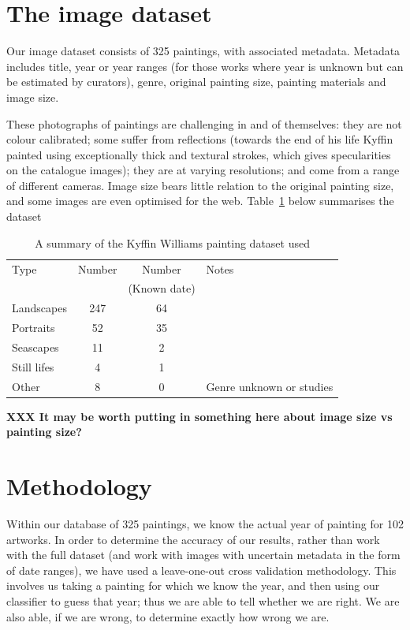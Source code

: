 \documentclass[conference,a4paper]{IEEEtran}
\begin{document}
\section{The image dataset}

Our image dataset consists of 325 paintings, with associated metadata. Metadata
includes title, year or year ranges (for those works where year is unknown but
can be estimated by curators), genre, original painting size, painting
materials and image size.

These photographs of paintings are challenging in and of themselves: they are
not colour calibrated; some suffer from reflections (towards the end of his
life Kyffin painted using exceptionally thick and textural strokes, which gives
specularities on the catalogue images); they are at varying resolutions; and
come from a range of different cameras. Image size bears little relation to the
original painting size, and some images are even optimised for the web.
Table~\ref{summary_t} below summarises the dataset

\begin{table}[h]
\centering
\begin{tabular}{| l | c | c | p{3cm} |}
\hline
Type & Number & Number & Notes \\
  & & (Known date) &  \\
\hline
Landscapes  & 247 & 64 & \\
Portraits   &  52 & 35 & \\
Seascapes   &  11 &  2 & \\
Still lifes &   4 &  1 & \\
Other       &   8 &  0 & Genre unknown or studies \\
\hline
\end{tabular}
\caption{A summary of the Kyffin Williams painting dataset used}
\label{summary_t}
\end{table}

\textbf{XXX It may be worth putting in something here about image size vs painting size?}


\section{Methodology}

Within our database of 325 paintings, we know the actual year of painting for
102 artworks. In order to determine the accuracy of our results, rather than
work with the full dataset (and work with images with uncertain metadata in the
form of date ranges), we have used a leave-one-out cross validation
methodology. This involves us taking a painting for which we know the year, and
then using our classifier to guess that year; thus we are able to tell whether
we are right. We are also able, if we are wrong, to determine exactly how wrong
we are.  
\end{document}
